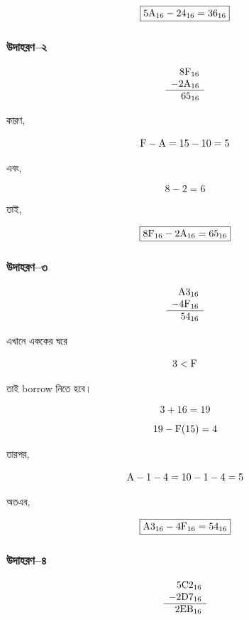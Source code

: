 \[
\boxed{
5\text{\textenglish{A}}_{16}
-
24_{16}
=
36_{16}
}
\]

\subsubsection*{উদাহরণ--২}

\[
\begin{array}{r}
8\text{\textenglish{F}}_{16}\\
-2\text{\textenglish{A}}_{16}\\
\hline
65_{16}
\end{array}
\]

কারণ,

\[
\text{\textenglish{F}}
-
\text{\textenglish{A}}
=
15-10
=
5
\]

এবং,

\[
8-2=6
\]

তাই,

\[
\boxed{
8\text{\textenglish{F}}_{16}
-
2\text{\textenglish{A}}_{16}
=
65_{16}
}
\]

\subsubsection*{উদাহরণ--৩}

\[
\begin{array}{r}
\text{\textenglish{A}}3_{16}\\
-4\text{\textenglish{F}}_{16}\\
\hline
54_{16}
\end{array}
\]

এখানে এককের ঘরে

\[
3<\text{\textenglish{F}}
\]

তাই \textenglish{borrow} নিতে হবে।

\[
3+16=19
\]

\[
19-\text{\textenglish{F}}(15)=4
\]

তারপর,

\[
\text{\textenglish{A}}-1-4
=
10-1-4
=
5
\]

অতএব,

\[
\boxed{
\text{\textenglish{A}}3_{16}
-
4\text{\textenglish{F}}_{16}
=
54_{16}
}
\]

\subsubsection*{উদাহরণ--৪}

\[
\begin{array}{r}
5\text{\textenglish{C}}2_{16}\\
-2\text{\textenglish{D}}7_{16}\\
\hline
2\text{\textenglish{EB}}_{16}
\end{array}
\]

